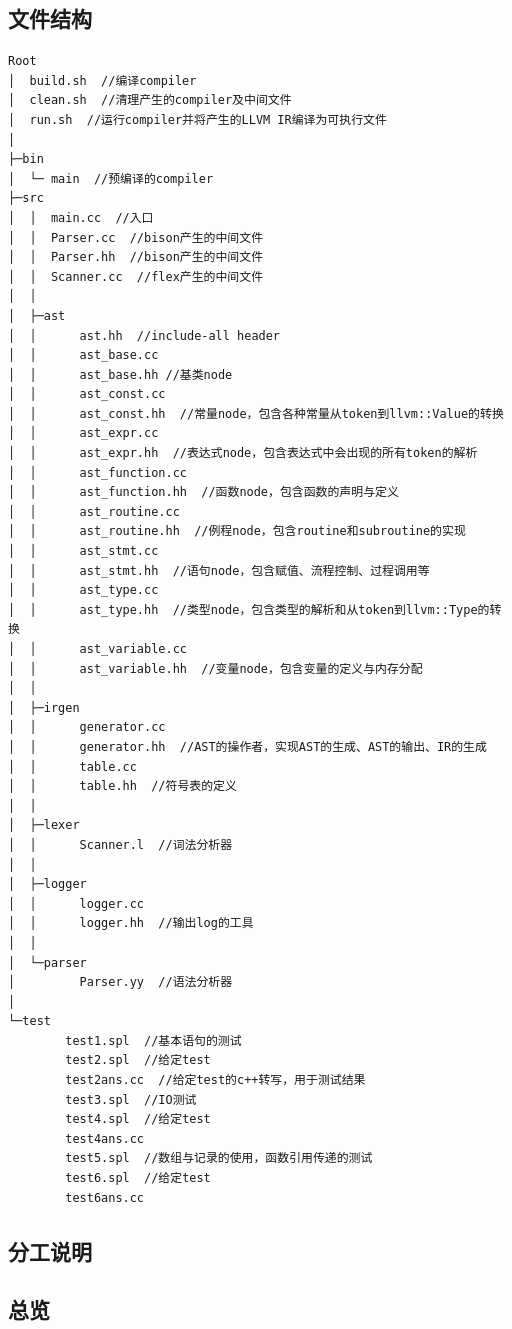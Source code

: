 \documentclass{article}
\begin{document}
\subsection*{文件结构}
\begin{lstlisting}
Root
│  build.sh  //编译compiler
│  clean.sh  //清理产生的compiler及中间文件
│  run.sh  //运行compiler并将产生的LLVM IR编译为可执行文件
│
├─bin
│  └─ main  //预编译的compiler
├─src
│  │  main.cc  //入口
│  │  Parser.cc  //bison产生的中间文件
│  │  Parser.hh  //bison产生的中间文件
│  │  Scanner.cc  //flex产生的中间文件
│  │
│  ├─ast
│  │      ast.hh  //include-all header
│  │      ast_base.cc
│  │      ast_base.hh //基类node
│  │      ast_const.cc
│  │      ast_const.hh  //常量node，包含各种常量从token到llvm::Value的转换
│  │      ast_expr.cc
│  │      ast_expr.hh  //表达式node，包含表达式中会出现的所有token的解析
│  │      ast_function.cc
│  │      ast_function.hh  //函数node，包含函数的声明与定义
│  │      ast_routine.cc
│  │      ast_routine.hh  //例程node，包含routine和subroutine的实现
│  │      ast_stmt.cc
│  │      ast_stmt.hh  //语句node，包含赋值、流程控制、过程调用等
│  │      ast_type.cc
│  │      ast_type.hh  //类型node，包含类型的解析和从token到llvm::Type的转换
│  │      ast_variable.cc
│  │      ast_variable.hh  //变量node，包含变量的定义与内存分配
│  │
│  ├─irgen
│  │      generator.cc
│  │      generator.hh  //AST的操作者，实现AST的生成、AST的输出、IR的生成
│  │      table.cc
│  │      table.hh  //符号表的定义
│  │
│  ├─lexer
│  │      Scanner.l  //词法分析器
│  │
│  ├─logger
│  │      logger.cc
│  │      logger.hh  //输出log的工具
│  │
│  └─parser
│         Parser.yy  //语法分析器
│
└─test
        test1.spl  //基本语句的测试
        test2.spl  //给定test
        test2ans.cc  //给定test的c++转写，用于测试结果
        test3.spl  //IO测试
        test4.spl  //给定test
        test4ans.cc
        test5.spl  //数组与记录的使用，函数引用传递的测试
        test6.spl  //给定test
        test6ans.cc

\end{lstlisting}

\subsection*{分工说明}

\subsection*{总览}
\end{document}
